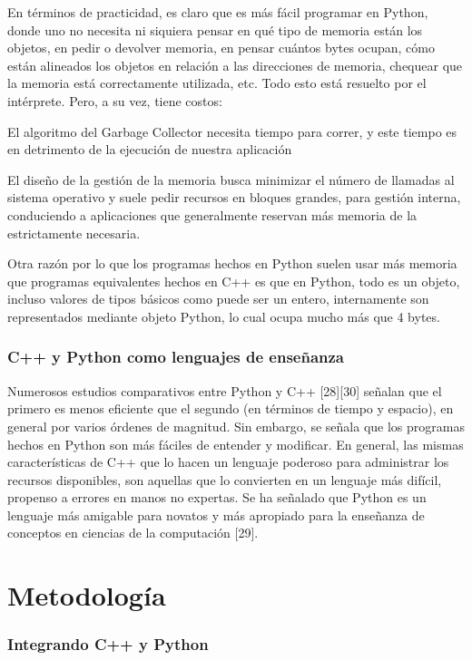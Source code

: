 \documentclass[]{article}
\begin{document}
En términos de practicidad, es claro que es más fácil programar en Python,
donde uno no necesita ni siquiera pensar en qué tipo de memoria están los
objetos, en pedir o devolver memoria, en pensar cuántos bytes ocupan, cómo
están alineados los objetos en relación a las direcciones de memoria, chequear
que la memoria está correctamente utilizada, etc. Todo esto está resuelto por
el intérprete. Pero, a su vez, tiene costos:


El algoritmo del Garbage Collector necesita tiempo para correr, y este tiempo
es en detrimento de la ejecución de nuestra aplicación

El diseño de la gestión de la memoria busca minimizar el número de llamadas al
sistema operativo y suele pedir recursos en bloques grandes, para gestión
interna, conduciendo a aplicaciones que generalmente reservan más memoria de la
estrictamente necesaria.

Otra razón por lo que los programas hechos en Python suelen usar más memoria
que programas equivalentes hechos en C++ es que en Python, todo es un objeto,
incluso valores de tipos básicos como puede ser un entero, internamente son
representados mediante objeto Python, lo cual ocupa mucho más que 4 bytes.

\subsubsection{C++ y Python como lenguajes de enseñanza}

Numerosos estudios comparativos entre Python y C++ [28][30]  señalan que el
primero es menos eficiente que el segundo (en términos de tiempo y espacio), en
general por varios órdenes de magnitud. Sin embargo, se señala que los
programas hechos en Python son más fáciles de entender y modificar. En general,
las mismas características de C++ que lo hacen un lenguaje poderoso para
administrar los recursos disponibles, son aquellas que lo convierten en un
lenguaje más difícil, propenso a errores en manos no expertas. Se ha señalado
que Python es un lenguaje más amigable para novatos y más apropiado para la
enseñanza de conceptos en ciencias de la computación [29].

\section{Metodología}

\subsubsection{Integrando C++ y Python}
\end{document}
